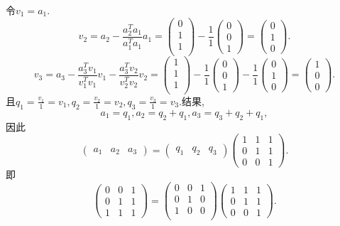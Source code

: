 ﻿\documentclass{book} \usepackage{exsheets} \usepackage{xeCJK}
\begin{document}
\begin{solution}
令$v_1=a_1$.
$$
v_2=a_2-\frac{a_2^Ta_1}{a_1^Ta_1}a_1=
\begin{pmatrix}
  0\\
1\\
1\\
\end{pmatrix}-\frac{1}{1}
\begin{pmatrix}
  0\\
0\\
1
\end{pmatrix}=
\begin{pmatrix}
  0\\
1\\
0
\end{pmatrix}.
$$
$$
v_3=a_3-\frac{a_3^Tv_1}{v_1^Tv_1}v_1-\frac{a_3^Tv_2}{v_2^Tv_2}v_2=
\begin{pmatrix}
  1\\
1\\
1\\
\end{pmatrix}-\frac{1}{1}
\begin{pmatrix}
  0\\
0\\
1
\end{pmatrix}-\frac{1}{1}
\begin{pmatrix}
  0\\
1\\
0
\end{pmatrix}=
\begin{pmatrix}
  1\\
0\\
0
\end{pmatrix}.
$$
且$q_1=\frac{v_1}{1}=v_1,q_2=\frac{v_2}{1}=v_2,q_3=\frac{v_3}{1}=v_3$.结果,
$$
a_1=q_1,a_2=q_2+q_1,a_3=q_3+q_2+q_1,
$$
因此
$$
\begin{pmatrix}
  a_1&a_2&a_3
\end{pmatrix}=
\begin{pmatrix}
  q_1&q_2&q_3
\end{pmatrix}
\begin{pmatrix}
  1&1&1\\
  0&1&1\\
  0&0&1
\end{pmatrix}.
$$即
$$
\begin{pmatrix}
  0&0&1\\
  0&1&1\\
  1&1&1
\end{pmatrix}=
\begin{pmatrix}
0&0 &1\\
0&1 &0\\
1&0 &0\\
\end{pmatrix}
\begin{pmatrix}
  1&1&1\\
  0&1&1\\
  0&0&1
\end{pmatrix}.
$$      
\end{solution}
\end{document}
